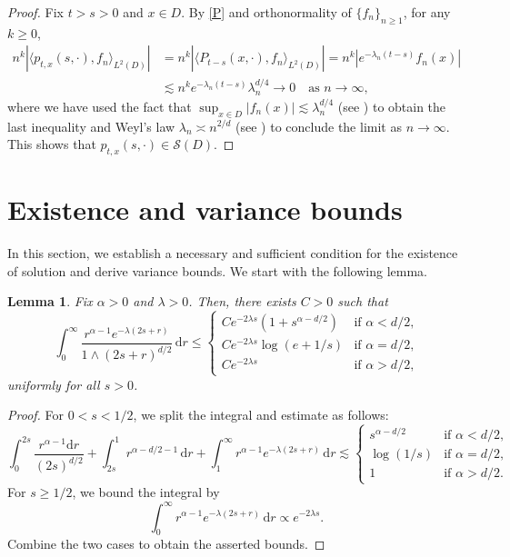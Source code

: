 \documentclass[reqno]{amsart}
\renewcommand{\d}{\mathrm d}
\newcommand{\1}{\mathbf 1}
\numberwithin{equation}{section}
\newtheorem{lemma}[theorem]{Lemma}
\theoremstyle{definition}
\begin{document}
\begin{proof}
Fix $t>s>0$ and $x \in D$.
By \eqref{P} and orthonormality of $\{f_n\}_{n \ge 1}$, for any $k \ge 0$,
\begin{align*}
	n^k \left|\langle p_{t,x}(s,\cdot), f_n \rangle_{L^2(D)}\right|
	& = n^k \left| \langle P_{t-s}(x,\cdot), f_n\rangle_{L^2(D)}\right|
	= n^k |e^{-\lambda_n(t-s)} f_n(x)|\\
	&\lesssim n^k e^{-\lambda_n(t-s)} \lambda_n^{d/4} \to 0 \quad \text{as $n \to \infty$,}
\end{align*}
where we have used the fact that $\sup_{x \in D}|f_n(x)|\lesssim \lambda_n^{d/4}$ (see \cite[Proposition 5]{F95}) to obtain the last inequality and Weyl's law $\lambda_n \asymp n^{2/d}$ (see \cite[Corollary 3.15]{FLW}) to conclude the limit as $n \to \infty$.
This shows that $p_{t,x}(s,\cdot) \in \mathcal{S}(D)$.
\end{proof}

\section{Existence and variance bounds}\label{s:exist}

In this section, we establish a necessary and sufficient condition for the existence of solution and derive variance bounds.
We start with the following lemma.

\begin{lemma}\label{lem:r-integral}
Fix $\alpha>0$ and $\lambda>0$.
Then, there exists $C>0$ such that
\[
	\int_0^\infty \frac{r^{\alpha-1} e^{-\lambda(2s+r)}}{1 \wedge (2s+r)^{d/2}} \, \d r
	\le \begin{cases}
	C e^{-2\lambda s}(1+ s^{\alpha-d/2}) & \text{if $\alpha<d/2$,}\\
	C e^{-2\lambda s}\log(e + 1/s) & \text{if $\alpha=d/2$,}\\
	C e^{-2\lambda s} & \text{if $\alpha>d/2$,}
	\end{cases}
\]
uniformly for all $s>0$.
\end{lemma}

\begin{proof}
For $0<s<1/2$, we split the integral and estimate as follows:
\[
	\int_0^{2s} \frac{r^{\alpha-1}\d r}{(2s)^{d/2}}  + \int_{2s}^1 r^{\alpha-d/2-1} \, \d r + \int_1^\infty r^{\alpha-1} e^{-\lambda(2s+r)} \, \d r
	\lesssim
	\begin{cases}
	s^{\alpha-d/2} & \text{if $\alpha<d/2$,}\\
	\log(1/s) & \text{if $\alpha=d/2$,}\\
	1 & \text{if $\alpha>d/2$.}
	\end{cases}
\]
For $s\ge 1/2$, we bound the integral by
\[
	\int_0^\infty r^{\alpha-1} e^{-\lambda(2s+r)} \, \d r \propto e^{-2\lambda s}.
\]
Combine the two cases to obtain the asserted bounds.
\end{proof}
\end{document}
